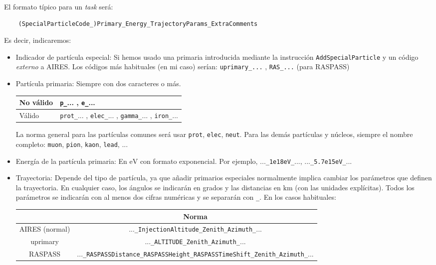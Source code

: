 \documentclass[a4paper,12pt]{article}
\numberwithin{equation}{section}
\numberwithin{figure}{section}
\begin{document}
El formato típico para un \textit{task} será:

\begin{verbatim}
	(SpecialParticleCode_)Primary_Energy_TrajectoryParams_ExtraComments
\end{verbatim}
Es decir, indicaremos:
\begin{itemize}
	\item Indicador de partícula especial: Si hemos usado una primaria introducida mediante la instrucción \verb|AddSpecialParticle| y un código \textit{externo} a AIRES. Los códigos más habituales (en mi caso) serían:
	\verb|uprimary_...| , \verb|RAS_...| (para RASPASS)
	\item Partícula primaria: Siempre con dos caracteres o más.
\begin{table}[H]
	\centering
	\begin{tabular}{|l|l|}
		\hline
		No válido &\verb|p_|... , \verb|e_|...                                              \\ \hline
		Válido    & \verb|prot_|...   ,    \verb|elec_|...   ,   \verb|gamma_|...   ,    \verb|iron_|... \\ \hline
	\end{tabular}
\end{table}

La norma general para las partículas comunes será usar \verb|prot|, \verb|elec|, \verb|neut|. Para las demás partículas y núcleos, siempre el nombre completo: \verb|muon|, \verb|pion|, \verb|kaon|, \verb|lead|, ...

\item Energía de la partícula primaria: En $\mathrm{eV}$ con formato exponencial. Por ejemplo, ...\verb|_1e18eV_|..., ...\verb|_5.7e15eV_|... 
\item Trayectoria: Depende del tipo de partícula, ya que añadir primarios especiales normalmente implica cambiar los parámetros que definen la trayectoria. En cualquier caso, los ángulos se indicarán en grados y las distancias en $\mathrm{km}$ (con las unidades explícitas). Todos los parámetros se indicarán con  al menos dos cifras numéricas y se separarán con \verb|_|. En los casos habituales:

\begin{table}[H]
	\centering
	\begin{tabular}{c|c|}
		\cline{2-2}
		\multicolumn{1}{l|}{}                & Norma                                                                     \\ \hline
		\multicolumn{1}{|c|}{AIRES (normal)} & ...\verb|_InjectionAltitude_Zenith_Azimuth_|...                                \\ \hline
		\multicolumn{1}{|c|}{uprimary}       & ...\verb|_ALTITUDE_Zenith_Azimuth_|...                                         \\ \hline
		\multicolumn{1}{|c|}{RASPASS}        & ...\verb|_RASPASSDistance_RASPASSHeight_RASPASSTimeShift_Zenith_Azimuth_|... \\ \hline
	\end{tabular}
\end{table}


\end{itemize}
\end{document}
